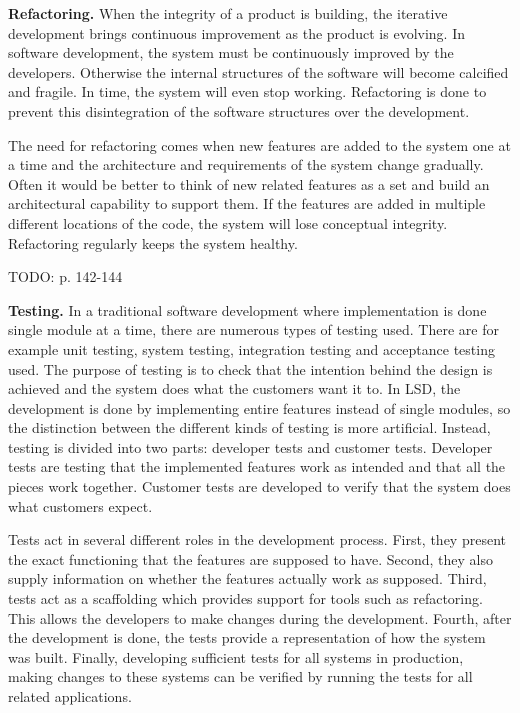 \textbf{Refactoring.} When the integrity of a product is building, the iterative development brings continuous improvement as the product is evolving. In software development, the system must be continuously improved by the developers. Otherwise the internal structures of the software will become calcified and fragile. In time, the system will even stop working. Refactoring is done to prevent this disintegration of the software structures over the development.

The need for refactoring comes when new features are added to the system one at a time and the architecture and requirements of the system change gradually. Often it would be better to think of new related features as a set and build an architectural capability to support them. If the features are added in multiple different locations of the code, the system will lose conceptual integrity. Refactoring regularly keeps the system healthy.

TODO: p. 142-144

\textbf{Testing.} In a traditional software development where implementation is done single module at a time, there are numerous types of testing used. There are for example unit testing, system testing, integration testing and acceptance testing used. The purpose of testing is to check that the intention behind the design is achieved and the system does what the customers want it to. In LSD, the development is done by implementing entire features instead of single modules, so the distinction between the different kinds of testing is more artificial. Instead, testing is divided into two parts: developer tests and customer tests. Developer tests are testing that the implemented features work as intended and that all the pieces work together. Customer tests are developed to verify that the system does what customers expect.

Tests act in several different roles in the development process. First, they present the exact functioning that the features are supposed to have. Second, they also supply information on whether the features actually work as supposed. Third, tests act as a scaffolding which provides support for tools such as refactoring. This allows the developers to make changes during the development. Fourth, after the development is done, the tests provide a representation of how the system was built. Finally, developing sufficient tests for all systems in production, making changes to these systems can be verified by running the tests for all related applications.

